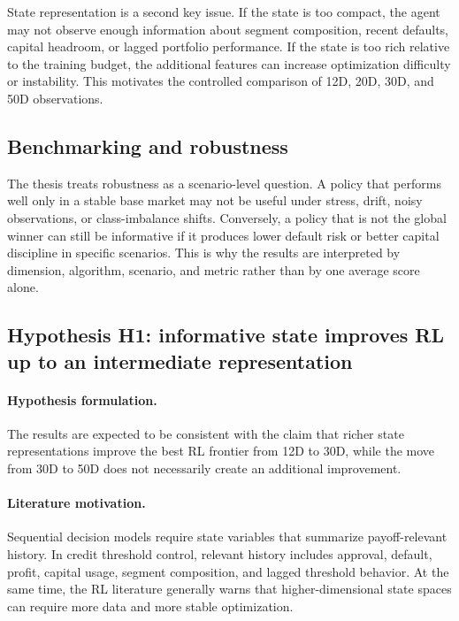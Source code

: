 \documentclass[12pt,a4paper]{article}
\begin{document}
State representation is a second key issue. If the state is too compact, the agent may not observe enough information about segment composition, recent defaults, capital headroom, or lagged portfolio performance. If the state is too rich relative to the training budget, the additional features can increase optimization difficulty or instability. This motivates the controlled comparison of 12D, 20D, 30D, and 50D observations.

\subsection{Benchmarking and robustness}

The thesis treats robustness as a scenario-level question. A policy that performs well only in a stable base market may not be useful under stress, drift, noisy observations, or class-imbalance shifts. Conversely, a policy that is not the global winner can still be informative if it produces lower default risk or better capital discipline in specific scenarios. This is why the results are interpreted by dimension, algorithm, scenario, and metric rather than by one average score alone.

\subsection{Hypothesis H1: informative state improves RL up to an intermediate representation}
\label{sec:hypotheses}

\paragraph{Hypothesis formulation.}
The results are expected to be consistent with the claim that richer state representations improve the best RL frontier from 12D to 30D, while the move from 30D to 50D does not necessarily create an additional improvement.

\paragraph{Literature motivation.}
Sequential decision models require state variables that summarize payoff-relevant history. In credit threshold control, relevant history includes approval, default, profit, capital usage, segment composition, and lagged threshold behavior. At the same time, the RL literature generally warns that higher-dimensional state spaces can require more data and more stable optimization.
\end{document}
